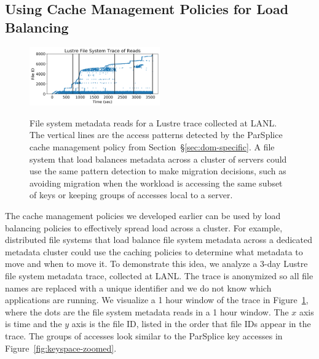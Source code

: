 \subsection{Using Cache Management Policies for Load Balancing}

\begin{figure}[t]
\noindent\includegraphics[width=0.5\textwidth]{figures/trace-atime.png}\\
\caption{File system metadata reads for a Lustre trace collected at LANL. The
vertical lines are the access patterns detected by the ParSplice cache
management policy from Section~\S\ref{sec:dom-specific}. A file system that
load balances metadata across a cluster of servers could use the same pattern
detection to make migration decisions, such as avoiding migration when the
workload is accessing the same subset of keys or keeping groups of accesses
local to a server.  \label{fig:trace-atime}}
\end{figure}


The cache management policies we developed earlier can be used by load
balancing policies to effectively spread load across a cluster. For example,
distributed file systems that load balance file system metadata across a
dedicated metadata cluster could use the caching policies to determine what
metadata to move and when to move it.  To demonstrate this idea, we analyze a
3-day Lustre file system metadata trace, collected at LANL.  The trace is
anonymized so all file names are replaced with a unique identifier and we do
not know which applications are running. We visualize a 1 hour window of the
trace in Figure~\ref{fig:trace-atime}, where the dots are the file system
metadata reads in a 1 hour window.  The \(x\) axis is time and the \(y\) axis
is the file ID, listed in the order that file IDs appear in the trace.  The
groups of accesses look similar to the ParSplice key accesses in
Figure~\ref{fig:keyspace-zoomed}. 

